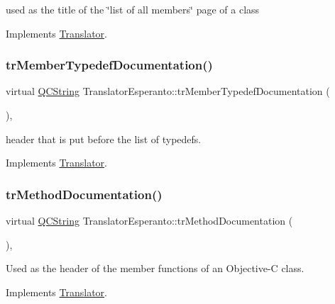 used as the title of the \char`\"{}list of all members\char`\"{} page of a class 

Implements \mbox{\hyperlink{class_translator}{Translator}}.

\mbox{\label{class_translator_esperanto_aaa5441db3c6b69cb7a129dca3ac3e079}} 
\subsubsection{\texorpdfstring{trMemberTypedefDocumentation()}{trMemberTypedefDocumentation()}}
{\footnotesize\ttfamily virtual \mbox{\hyperlink{class_q_c_string}{Q\+C\+String}} Translator\+Esperanto\+::tr\+Member\+Typedef\+Documentation (\begin{DoxyParamCaption}{ }\end{DoxyParamCaption})\hspace{0.3cm}{\ttfamily [inline]}, {\ttfamily [virtual]}}

header that is put before the list of typedefs. 

Implements \mbox{\hyperlink{class_translator}{Translator}}.

\mbox{\label{class_translator_esperanto_a11d39ce9aa3daa1eb9623243a36abde1}} 
\subsubsection{\texorpdfstring{trMethodDocumentation()}{trMethodDocumentation()}}
{\footnotesize\ttfamily virtual \mbox{\hyperlink{class_q_c_string}{Q\+C\+String}} Translator\+Esperanto\+::tr\+Method\+Documentation (\begin{DoxyParamCaption}{ }\end{DoxyParamCaption})\hspace{0.3cm}{\ttfamily [inline]}, {\ttfamily [virtual]}}

Used as the header of the member functions of an Objective-\/C class. 

Implements \mbox{\hyperlink{class_translator}{Translator}}.


